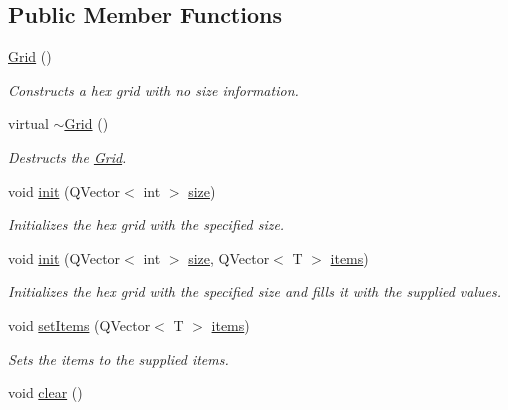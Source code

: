 \subsection*{\-Public \-Member \-Functions}
\begin{DoxyCompactItemize}
\item 
\hypertarget{classhsom_1_1_grid_aba0fb79105155eff14ca1d083af1d406}{\hyperlink{classhsom_1_1_grid_aba0fb79105155eff14ca1d083af1d406}{\-Grid} ()}\label{classhsom_1_1_grid_aba0fb79105155eff14ca1d083af1d406}

\begin{DoxyCompactList}\small\item\em \-Constructs a hex grid with no size information. \end{DoxyCompactList}\item 
\hypertarget{classhsom_1_1_grid_a9d6958c2d779bba109a5db3bc668e32c}{virtual \hyperlink{classhsom_1_1_grid_a9d6958c2d779bba109a5db3bc668e32c}{$\sim$\-Grid} ()}\label{classhsom_1_1_grid_a9d6958c2d779bba109a5db3bc668e32c}

\begin{DoxyCompactList}\small\item\em \-Destructs the \hyperlink{classhsom_1_1_grid}{\-Grid}. \end{DoxyCompactList}\item 
void \hyperlink{classhsom_1_1_grid_a0b78153431550f6261a64085e8fd2f47}{init} (\-Q\-Vector$<$ int $>$ \hyperlink{classhsom_1_1_grid_a3e846473299eb2c7c259659eb61a6234}{size})
\begin{DoxyCompactList}\small\item\em \-Initializes the hex grid with the specified size. \end{DoxyCompactList}\item 
void \hyperlink{classhsom_1_1_grid_a4f786deb4f55e777998b3d7e0c0822e7}{init} (\-Q\-Vector$<$ int $>$ \hyperlink{classhsom_1_1_grid_a3e846473299eb2c7c259659eb61a6234}{size}, \-Q\-Vector$<$ \-T $>$ \hyperlink{classhsom_1_1_grid_ae6b6ffb72e86c3904e8ac21253d85a24}{items})
\begin{DoxyCompactList}\small\item\em \-Initializes the hex grid with the specified size and fills it with the supplied values. \end{DoxyCompactList}\item 
void \hyperlink{classhsom_1_1_grid_ad9ca398c85fd00afc3de894e5bc52dfe}{set\-Items} (\-Q\-Vector$<$ \-T $>$ \hyperlink{classhsom_1_1_grid_ae6b6ffb72e86c3904e8ac21253d85a24}{items})
\begin{DoxyCompactList}\small\item\em \-Sets the items to the supplied items. \end{DoxyCompactList}\item 
\hypertarget{classhsom_1_1_grid_a7f6bd884d4b407dee64985a37fe0bd92}{void \hyperlink{classhsom_1_1_grid_a7f6bd884d4b407dee64985a37fe0bd92}{clear} ()}\label{classhsom_1_1_grid_a7f6bd884d4b407dee64985a37fe0bd92}


\end{DoxyCompactItemize}
